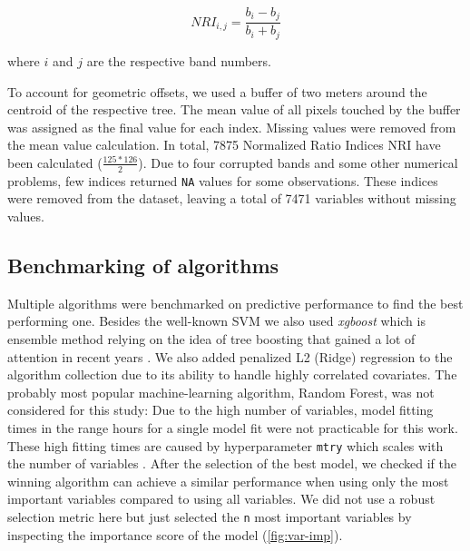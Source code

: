 \documentclass[review]{elsarticle}
\begin{document}
\begin{equation}
	NRI_{i,j} = \frac{b_{i} - b_{j}}{b_{i} + b_{j}}
\end{equation}

\noindent
where $i$ and $j$ are the respective band numbers.

To account for geometric offsets, we used a buffer of two meters around the centroid of the respective tree.
The mean value of all pixels touched by the buffer was assigned as the final value for each index.
Missing values were removed from the mean value calculation.
In total, 7875 Normalized Ratio Indices NRI have been calculated ($\frac{125*126}{2}$).
Due to four corrupted bands and some other numerical problems, few indices returned \texttt{NA} values for some observations.
These indices were removed from the dataset, leaving a total of 7471 variables without missing values.

\subsection{Benchmarking of algorithms}

Multiple algorithms were benchmarked on predictive performance to find the best performing one.
Besides the well-known \ac{SVM} \citep{Vapnik1998} we also used \textit{xgboost} which is ensemble method relying on the idea of tree boosting that gained a lot of attention in recent years \citep{chenXGBoostScalableTree2016}.
We also added penalized L2 (Ridge) regression to the algorithm collection due to its ability to handle highly correlated covariates.
The probably most popular machine-learning algorithm, Random Forest, was not considered for this study: Due to the high number of variables, model fitting times in the range hours for a single model fit were not practicable for this work.
These high fitting times are caused by hyperparameter \texttt{mtry} which scales with the number of variables \citep{Probst2018b}.
After the selection of the best model, we checked if the winning algorithm can achieve a similar performance when using only the most important variables compared to using all variables.
We did not use a robust selection metric here but just selected the \texttt{n} most important variables by inspecting the importance score of the model (\autoref{fig:var-imp}). 

\end{document}

